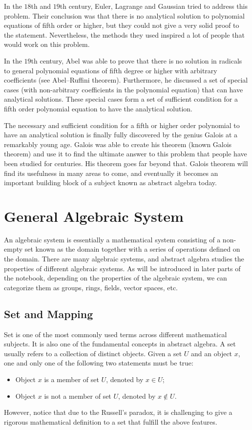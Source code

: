 In the $18$th and $19$th century, Euler, Lagrange and Gaussian tried to address this problem. Their conclusion was that there is no analytical solution to polynomial equations of fifth order or higher, but they could not give a very solid proof to the statement. Nevertheless, the methods they used inspired a lot of people that would work on this problem.

In the $19$th century, Abel was able to prove that there is no solution in radicals to general polynomial equations of fifth degree or higher with arbitrary coefficients (see Abel–Ruffini theorem). Furthermore, he discussed a set of special cases (with non-arbitrary coefficients in the polynomial equation) that can have analytical solutions. These special cases form a set of sufficient condition for a fifth order polynomial equation to have the analytical solution. 

The necessary and sufficient condition for a fifth or higher order polynomial to have an analytical solution is finally fully discovered by the genius Galois at a remarkably young age. Galois was able to create his theorem (known Galois theorem) and use it to find the ultimate answer to this problem that people have been studied for centuries. His theorem goes far beyond that. Galois theorem will find its usefulness in many areas to come, and eventually it becomes an important building block of a subject known as abstract algebra today. 

\section{General Algebraic System}

An algebraic system is essentially a mathematical system consisting of a non-empty set known as the domain together with a series of operations defined on the domain. There are many algebraic systems, and abstract algebra studies the properties of different algebraic systems. As will be introduced in later parts of the notebook, depending on the properties of the algebraic system, we can categorize them as groups, rings, fields, vector spaces, etc.

\subsection{Set and Mapping}

Set is one of the most commonly used terms across different mathematical subjects. It is also one of the fundamental concepts in abstract algebra. A set usually refers to a collection of distinct objects. Given a set $U$ and an object $x$, one and only one of the following two statements must be true:
\begin{itemize}
  \item Object $x$ is a member of set $U$, denoted by $x \in U$;
  \item Object $x$ is not a member of set $U$, denoted by $x \notin U$.
\end{itemize}
However, notice that due to the Russell's paradox, it is challenging to give a rigorous mathematical definition to a set that fulfill the above features.

